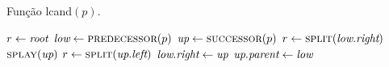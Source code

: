 \begin{algorithm}[H]
    \caption[Algoritmo \textsc{lcand} do par mais próximo]{Função lcand$(p)$.} \label{alg:par-estatico:lcand}
    \begin{algorithmic}[1]
            \State $r \leftarrow \textit{root}$
            \State $\low \leftarrow \Call{predecessor}{p}$
            \State $\up \leftarrow \Call{successor}{p}$
            \If{$\low \neq \nnull$}
                \State {}
                \State $r \leftarrow \Call{split}{\low.\dir}$
            \EndIf
            \If{$\up \neq \nnull$}
                \State $\Call{splay}{\up}$
                \State $r \leftarrow \Call{split}{\up.\esq}$
            \EndIf
            \If{$\up \neq \nnull$ \AND $\low \neq \nnull$}
                \State $\textit{low}.\textit{right} \leftarrow \textit{up}$
                \State $\textit{up}.\textit{parent} \leftarrow \textit{low}$
            \EndIf
            \State {}
        \EndFunction
    \end{algorithmic}
\end{algorithm}